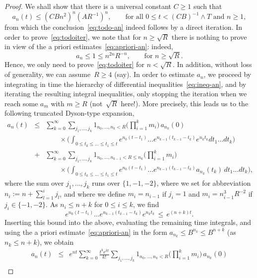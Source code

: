 \documentclass[10pt,a4paper]{amsart}
\begin{document}
\begin{proof}
We shall show that there is a universal constant $C\ge1$ such that
\begin{equation}\label{eq:todoiter}
a_n(t)\le (CBn^2)^n(AR^{-1} )^n,\qquad\text{for all $0\le t< (CB)^{-1}\wedge T$ and $n\ge1$},
\end{equation}
from which the conclusion~\eqref{eq:todo-an} indeed follows by a direct iteration.
In order to prove~\eqref{eq:todoiter}, we note that for $n\ge\sqrt R$ there is nothing to prove in view of the a priori estimates~\eqref{eq:apriori-an}: indeed,
\[a_n\le1\le n^{2n}R^{-n},\qquad\text{for $n\ge \sqrt R$}.\]
Hence, we only need to prove~\eqref{eq:todoiter} for $n<\sqrt R$.
In addition, without loss of generality, we can assume~$R\ge4$ (say).
In order to estimate $a_n$, we proceed by integrating in time the hierarchy of differential inequalities~\eqref{eq:ineq-an}, and by iterating the resulting integral inequalities, only stopping the iteration when we reach some $a_m$ with $m\ge R$ (not~$\sqrt R$ here!).
More precisely, this leads us to the following truncated Dyson-type expansion,
\begin{eqnarray*}
a_n(t)&\le&\sum_{k=0}^\infty\sum_{j_1,\ldots,j_k}1_{n_0,\ldots,n_k<R}\Big(\prod_{i=1}^km_i\Big)\,a_{n_k}(0)\\
&&\qquad\times\Big(\int_{0\le t_k\le\ldots\le t_1\le t}e^{n_0(t-t_1)}\ldots e^{n_{k-1}(t_{k-1}-t_k)}e^{n_kt_k}dt_1\ldots dt_k\Big)\\
&+&\sum_{k=0}^\infty\sum_{j_1,\ldots,j_k}1_{n_0,\ldots,n_{k-1}<R\le n_k}\Big(\prod_{i=1}^km_i\Big)\\
&&\qquad\times\Big(\int_{0\le t_k\le\ldots\le t_1\le t}e^{n_0(t-t_1)}\ldots e^{n_{k-1}(t_{k-1}-t_k)}a_{n_k}(t_k)\,dt_1\ldots dt_k\Big),
\end{eqnarray*}
where the sum over $j_1,\ldots,j_k$ runs over $\{1,-1,-2\}$, where we set for abbreviation $n_i:=n+\sum_{l=1}^ij_l$, and where we define $m_i=n_{i-1}$ if $j_i=1$ and $m_i=n_{i-1}^3R^{-2}$ if $j_i\in\{-1,-2\}$.
As $n_i\le n+k$ for $0\le i\le k$, we find
\[e^{n_0(t-t_1)}\ldots e^{n_{k-1}(t_{k-1}-t_k)}e^{n_kt_k}\,\le\, e^{(n+k)t}.\]
Inserting this bound into the above, evaluating the remaining time integrals, and using the a priori estimate~\eqref{eq:apriori-an} in the form $a_{n_k}\le B^{n_k}\le B^{n+k}$ (as $n_k\le n+k$), we obtain
\begin{eqnarray}
a_n(t)&\le&e^{nt}\sum_{k=0}^\infty \tfrac{t^ke^{kt}}{k!}\sum_{j_1,\ldots,j_k}1_{n_0,\ldots,n_k<R}\Big(\prod_{i=1}^km_i\Big)\,a_{n_k}(0)\nonumber\\

\end{eqnarray}
\end{proof}
\end{document}
